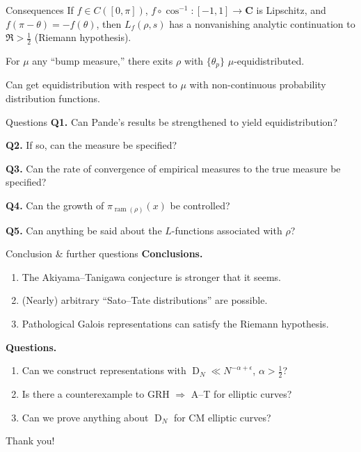 \documentclass{beamer}
\DeclareMathOperator{\D}{D}
\DeclareMathOperator{\ram}{ram}
\newcommand{\bC}{\mathbf{C}}
\begin{document}
\begin{frame}{Consequences}
If $f\in C([0,\pi])$, $f\circ \cos^{-1}\colon [-1,1]\to \bC$ is Lipschitz, and 
$f(\pi-\theta) = - f(\theta)$, then $L_f(\rho,s)$ has a nonvanishing analytic 
continuation to $\Re > \frac 1 2$ (Riemann hypothesis). 
\pause

For $\mu$ any ``bump measure,'' there exits $\rho$ with $\{\theta_p\}$ 
$\mu$-equidistributed. 
\pause

Can get equidistribution with respect to $\mu$ with non-continuous probability 
distribution functions.
\end{frame}



\begin{frame}{Questions}
\textbf{Q1.} Can Pande's results be strengthened to yield equidistribution? 

\textbf{Q2.} If so, can the measure be specified?

\textbf{Q3.} Can the rate of convergence of empirical measures to the true measure 
be specified?

\textbf{Q4.} Can the growth of $\pi_{\ram(\rho)}(x)$ be controlled?

\textbf{Q5.} Can anything be said about the $L$-functions associated with $\rho$?
\end{frame}



\begin{frame}{Conclusion \& further questions}
\textbf{Conclusions.}
\pause
\begin{enumerate}
\item
The Akiyama--Tanigawa conjecture is stronger that it seems.
\pause

\item
(Nearly) arbitrary ``Sato--Tate distributions'' are possible.
\pause

\item
Pathological Galois representations can satisfy the Riemann hypothesis.
\end{enumerate}
\pause

\textbf{Questions.}
\pause
\begin{enumerate}
\item
Can we construct representations with $\D_N \ll N^{-\alpha+\epsilon}$, 
$\alpha > \frac 1 2$?
\pause

\item
Is there a counterexample to GRH $\Rightarrow$ A--T for elliptic curves?
\pause

\item
Can we prove anything about $\D_N$ for CM elliptic curves?
\end{enumerate}
\end{frame}



\begin{frame}
\begin{center}
\Huge Thank you!
\end{center}
\end{frame}
\end{document}
